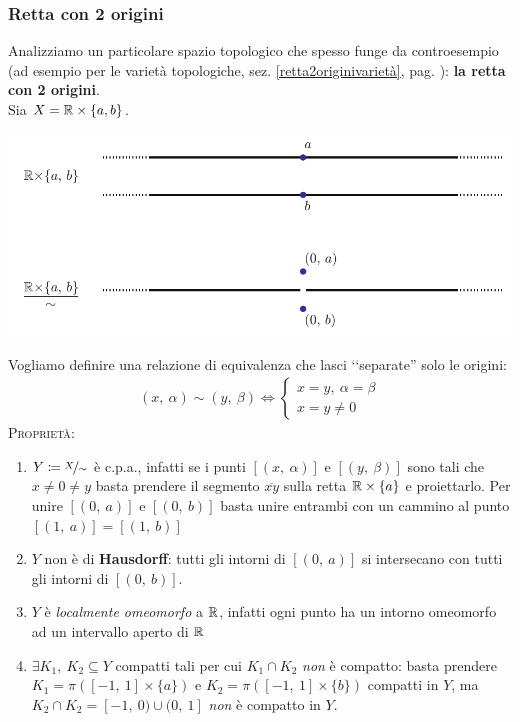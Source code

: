\subsubsection{Retta con 2 origini} \label{retta 2 origini}
Analizziamo un particolare spazio topologico che spesso funge da controesempio (ad esempio per le varietà topologiche, sez. \ref{retta2originivarietà}, pag. \pageref{retta2originivarietà}): \textbf{la retta con 2 origini}. \\
Sia $X=\mathbb{R}\times\{a,b\}$.
\begin{center}
	\includegraphics[trim=0cm 0cm 0cm 0cm,clip,scale=0.95]{images/line2origins.pdf}
\end{center}
Vogliamo definire una relazione di equivalenza che lasci ‘‘separate'' solo le origini:
	\begin{gather*}
		(x, \ \alpha)\sim (y, \ \beta) \iff
			\begin{cases}
				x=y,\ \alpha=\beta \\
				x=y\neq 0
			\end{cases}		
	\end{gather*}
\textsc{Proprietà}:
\begin{enumerate}
	\item $Y\coloneqq \nicefrac{X}{\sim}$ è c.p.a., infatti se i punti $[(x, \ \alpha)]$ e $[(y, \ \beta)]$ sono tali che $x\neq 0 \neq y$ basta prendere il segmento $\overline{xy}$ sulla retta $\mathbb{R}\times\{a\}$ e proiettarlo. Per unire $[(0,\ a)]$ e $[(0, \ b)]$ basta unire entrambi con un cammino al punto $[(1, \ a)]=[(1, \ b)]$
	\item $Y$ non è di \textbf{Hausdorff}: tutti gli intorni di $[(0, \ a)]$ si intersecano con tutti gli intorni di $[(0, \ b)]$.
	\item $Y$ è \textit{localmente omeomorfo} a $\mathbb{R}$, infatti ogni punto ha un intorno omeomorfo ad un intervallo aperto di $\mathbb{R}$
	\item $\exists K_1, \ K_2\subseteq Y$ compatti tali per cui $K_1\cap K_2$ \textit{non} è compatto: basta prendere $K_1=\pi\left([-1, \ 1]\times \{a\} \right)$ e $K_2=\pi\left([-1, \ 1]\times \{b\} \right)$ compatti in $Y$, ma $K_2\cap K_2= [-1,\ 0) \cup (0,\ 1]$ \textit{non} è compatto in $Y$.
\end{enumerate}
